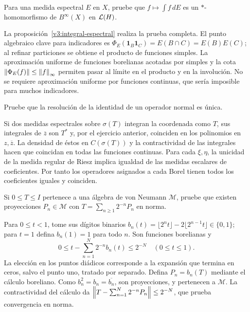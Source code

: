 \begin{ejercicio}\label{ej:v3-l34-1}
Para una medida espectral $E$ en $X$, pruebe que $f\mapsto\int f\,dE$ es un $*$-homomorfismo de $B^\infty(X)$ en $\mathcal L(H)$.
\end{ejercicio}
\begin{solucion}
La proposición~\ref{v3:integral-espectral} realiza la prueba completa. El punto algebraico clave para indicadores es
$\Phi_E(\mathbf1_B\mathbf1_C)=E(B\cap C)=E(B)E(C)$; al refinar particiones se obtiene el producto de funciones simples. La aproximación uniforme de funciones borelianas acotadas por simples y la cota $\left\lVert\Phi_E(f)\right\rVert\le\left\lVert f\right\rVert_\infty$ permiten pasar al límite en el producto y en la involución. No se requiere aproximación uniforme por funciones continuas, que sería imposible para muchos indicadores.
\end{solucion}

\begin{ejercicio}\label{ej:v3-l34-2}
Pruebe que la resolución de la identidad de un operador normal es única.
\end{ejercicio}
\begin{solucion}
Si dos medidas espectrales sobre $\sigma(T)$ integran la coordenada como $T$, sus integrales de $\overline z$ son $T^*$ y, por el ejercicio anterior, coinciden en los polinomios en $z,\overline z$. La densidad de éstos en $C(\sigma(T))$ y la contractividad de las integrales hacen que coincidan en todas las funciones continuas. Para cada $\xi,\eta$, la unicidad de la medida regular de Riesz implica igualdad de las medidas escalares de coeficientes. Por tanto los operadores asignados a cada Borel tienen todos los coeficientes iguales y coinciden.
\end{solucion}

\begin{ejercicio}\label{ej:v3-l34-3}
Si $0\le T\le I$ pertenece a una álgebra de von Neumann $\mathcal M$, pruebe que existen proyecciones $P_n\in\mathcal M$ con $T=\sum_{n\ge1}2^{-n}P_n$ en norma.
\end{ejercicio}
\begin{solucion}
Para $0\le t<1$, tome sus dígitos binarios
$b_n(t)=\lfloor2^nt\rfloor-2\lfloor2^{n-1}t\rfloor\in\{0,1\}$; para $t=1$ defina $b_n(1)=1$ para todo $n$. Son funciones borelianas y
\[
 0\le t-\sum_{n=1}^N2^{-n}b_n(t)\le2^{-N}
 \quad(0\le t\le1).
\]
La elección en los puntos diádicos corresponde a la expansión que termina en ceros, salvo el punto uno, tratado por separado. Defina $P_n=b_n(T)$ mediante el cálculo boreliano. Como $b_n^2=b_n=\overline{b_n}$, son proyecciones, y pertenecen a $\mathcal M$. La contractividad del cálculo da $\left\lVert T-\sum_{n=1}^N2^{-n}P_n\right\rVert\le2^{-N}$, que prueba convergencia en norma.
\end{solucion}

